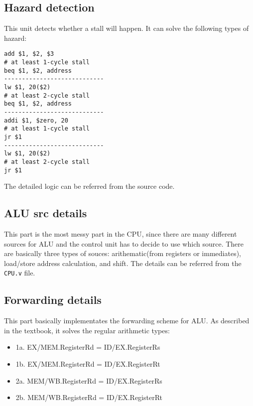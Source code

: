 \documentclass[
]{article}
\begin{document}
\hypertarget{header-n68}{%
\subsection{Hazard detection}\label{header-n68}}

This unit detects whether a stall will happen. It can solve the
following types of hazard:

\begin{verbatim}
add $1, $2, $3
# at least 1-cycle stall
beq $1, $2, address 
----------------------------
lw $1, 20($2)
# at least 2-cycle stall
beq $1, $2, address
----------------------------
addi $1, $zero, 20
# at least 1-cycle stall
jr $1
----------------------------
lw $1, 20($2)
# at least 2-cycle stall
jr $1
\end{verbatim}

The detailed logic can be referred from the source code.

\hypertarget{header-n134}{%
\subsection{ALU src details}\label{header-n134}}

This part is the most messy part in the CPU, since there are many
different sources for ALU and the control unit has to decide to use
which source. There are basically three types of souces:
arithematic(from registers or immediates), load/store address
calculation, and shift. The details can be referred from the
\texttt{CPU.v} file.

\hypertarget{header-n73}{%
\subsection{Forwarding details}\label{header-n73}}

This part basically implementates the forwarding scheme for ALU. As
described in the textbook, it solves the regular arithmetic types:

\begin{itemize}
\item
  1a. EX/MEM.RegisterRd = ID/EX.RegisterRs
\end{itemize}

\begin{itemize}
\item
  1b. EX/MEM.RegisterRd = ID/EX.RegisterRt
\item
  2a. MEM/WB.RegisterRd = ID/EX.RegisterRs
\item
  2b. MEM/WB.RegisterRd = ID/EX.RegisterRt
\end{itemize}
\end{document}
